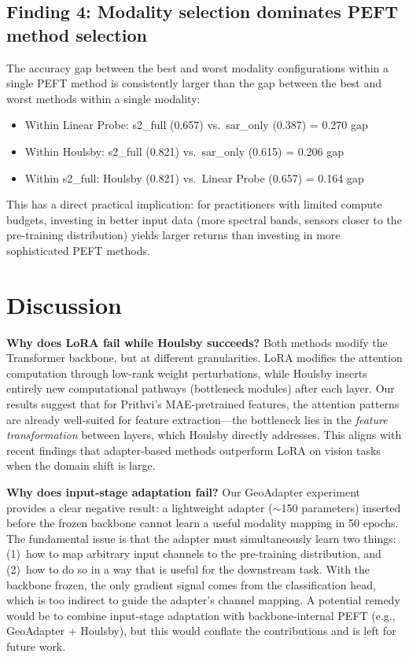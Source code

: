 \documentclass{article}
\begin{document}
\subsection{Finding 4: Modality selection dominates PEFT method selection}

The accuracy gap between the best and worst modality configurations within a single PEFT method is consistently larger than the gap between the best and worst methods within a single modality:

\begin{itemize}
\item Within Linear Probe: s2\_full (0.657) vs.\ sar\_only (0.387) = 0.270 gap
\item Within Houlsby: s2\_full (0.821) vs.\ sar\_only (0.615) = 0.206 gap
\item Within s2\_full: Houlsby (0.821) vs.\ Linear Probe (0.657) = 0.164 gap
\end{itemize}

This has a direct practical implication: for practitioners with limited compute budgets, investing in better input data (more spectral bands, sensors closer to the pre-training distribution) yields larger returns than investing in more sophisticated PEFT methods.

\section{Discussion}
\label{sec:discussion}

\textbf{Why does LoRA fail while Houlsby succeeds?} Both methods modify the Transformer backbone, but at different granularities. LoRA modifies the attention computation through low-rank weight perturbations, while Houlsby inserts entirely new computational pathways (bottleneck modules) after each layer. Our results suggest that for Prithvi's MAE-pretrained features, the attention patterns are already well-suited for feature extraction---the bottleneck lies in the \emph{feature transformation} between layers, which Houlsby directly addresses. This aligns with recent findings that adapter-based methods outperform LoRA on vision tasks when the domain shift is large.

\textbf{Why does input-stage adaptation fail?} Our GeoAdapter experiment provides a clear negative result: a lightweight adapter ($\sim$150 parameters) inserted before the frozen backbone cannot learn a useful modality mapping in 50 epochs. The fundamental issue is that the adapter must simultaneously learn two things: (1)~how to map arbitrary input channels to the pre-training distribution, and (2)~how to do so in a way that is useful for the downstream task. With the backbone frozen, the only gradient signal comes from the classification head, which is too indirect to guide the adapter's channel mapping. A potential remedy would be to combine input-stage adaptation with backbone-internal PEFT (e.g., GeoAdapter + Houlsby), but this would conflate the contributions and is left for future work.
\end{document}
